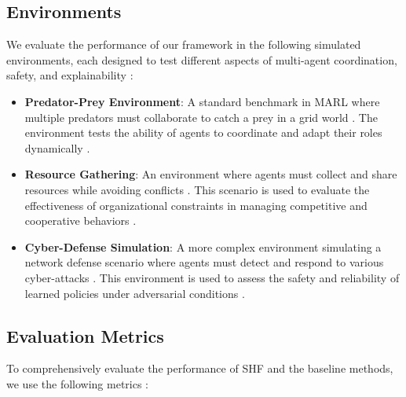 \documentclass[sigconf,anonymous]{aamas}
\begin{document}
\subsection{Environments}
We evaluate the performance of our framework in the following simulated environments, each designed to test different aspects of multi-agent coordination, safety, and explainability \cite{foerster2016learning, soule2024}:

\begin{itemize}
    \item \textbf{Predator-Prey Environment}: A standard benchmark in MARL where multiple predators must collaborate to catch a prey in a grid world \cite{foerster2016learning}. The environment tests the ability of agents to coordinate and adapt their roles dynamically \cite{foerster2018counterfactual}.
    \item \textbf{Resource Gathering}: An environment where agents must collect and share resources while avoiding conflicts \cite{foerster2018counterfactual}. This scenario is used to evaluate the effectiveness of organizational constraints in managing competitive and cooperative behaviors \cite{hubner2010moise}.
    \item \textbf{Cyber-Defense Simulation}: A more complex environment simulating a network defense scenario where agents must detect and respond to various cyber-attacks \cite{bastani2018verifiable}. This environment is used to assess the safety and reliability of learned policies under adversarial conditions \cite{wei2019safe}.
\end{itemize}

\subsection{Evaluation Metrics}
To comprehensively evaluate the performance of SHF and the baseline methods, we use the following metrics \cite{hubner2010moise, soule2024}:
\end{document}
